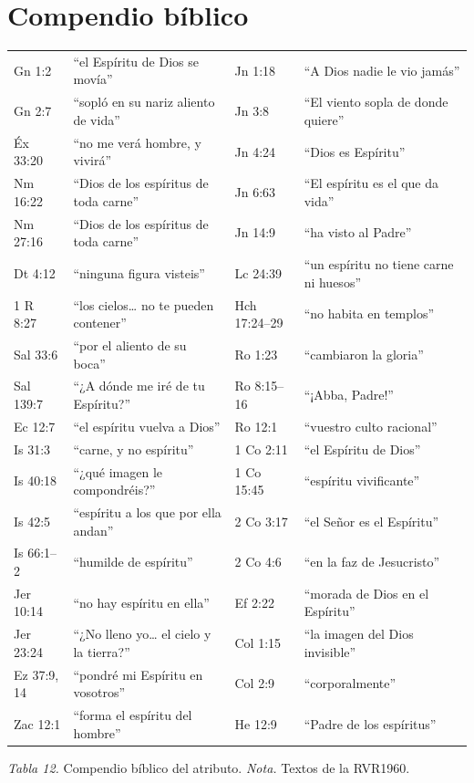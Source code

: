 \section*{Compendio bíblico}
\begin{center}\small\renewcommand{\arraystretch}{1.12}
\begin{tabular}{@{}L{2.2cm}L{5.0cm}|L{2.2cm}L{5.0cm}@{}}
\toprule
Gn 1:2 & ``el Espíritu de Dios se movía'' & Jn 1:18 & ``A Dios nadie le vio jamás'' \\
Gn 2:7 & ``sopló en su nariz aliento de vida'' & Jn 3:8 & ``El viento sopla de donde quiere'' \\
Éx 33:20 & ``no me verá hombre, y vivirá'' & Jn 4:24 & ``Dios es Espíritu'' \\
Nm 16:22 & ``Dios de los espíritus de toda carne'' & Jn 6:63 & ``El espíritu es el que da vida'' \\
Nm 27:16 & ``Dios de los espíritus de toda carne'' & Jn 14:9 & ``ha visto al Padre'' \\
Dt 4:12 & ``ninguna figura visteis'' & Lc 24:39 & ``un espíritu no tiene carne ni huesos'' \\
1 R 8:27 & ``los cielos\ldots{} no te pueden contener'' & Hch 17:24--29 & ``no habita en templos'' \\
Sal 33:6 & ``por el aliento de su boca'' & Ro 1:23 & ``cambiaron la gloria'' \\
Sal 139:7 & ``¿A dónde me iré de tu Espíritu?'' & Ro 8:15--16 & ``¡Abba, Padre!'' \\
Ec 12:7 & ``el espíritu vuelva a Dios'' & Ro 12:1 & ``vuestro culto racional'' \\
Is 31:3 & ``carne, y no espíritu'' & 1 Co 2:11 & ``el Espíritu de Dios'' \\
Is 40:18 & ``¿qué imagen le compondréis?'' & 1 Co 15:45 & ``espíritu vivificante'' \\
Is 42:5 & ``espíritu a los que por ella andan'' & 2 Co 3:17 & ``el Señor es el Espíritu'' \\
Is 66:1--2 & ``humilde de espíritu'' & 2 Co 4:6 & ``en la faz de Jesucristo'' \\
Jer 10:14 & ``no hay espíritu en ella'' & Ef 2:22 & ``morada de Dios en el Espíritu'' \\
Jer 23:24 & ``¿No lleno yo\ldots{} el cielo y la tierra?'' & Col 1:15 & ``la imagen del Dios invisible'' \\
Ez 37:9, 14 & ``pondré mi Espíritu en vosotros'' & Col 2:9 & ``corporalmente'' \\
Zac 12:1 & ``forma el espíritu del hombre'' & He 12:9 & ``Padre de los espíritus'' \\
\bottomrule
\end{tabular}\par
{\footnotesize\color{gris}\textit{Tabla 12.} Compendio bíblico del atributo. \textit{Nota.} Textos de la RVR1960.}
\end{center}

